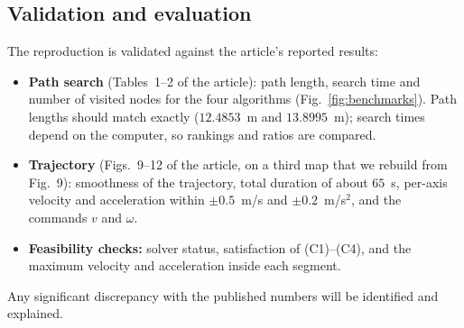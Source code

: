 \subsection{Validation and evaluation}
The reproduction is validated against the article's reported results:
\begin{itemize}
\item \textbf{Path search} (Tables~1--2 of the article): path length, search time and number of visited nodes for the four algorithms (Fig.~\ref{fig:benchmarks}). Path lengths should match exactly ($12.4853$~m and $13.8995$~m); search times depend on the computer, so rankings and ratios are compared.
\item \textbf{Trajectory} (Figs.~9--12 of the article, on a third map that we rebuild from Fig.~9): smoothness of the trajectory, total duration of about $65$~s, per-axis velocity and acceleration within $\pm0.5$~m/s and $\pm0.2$~m/s$^2$, and the commands $v$ and $\omega$.
\item \textbf{Feasibility checks:} solver status, satisfaction of (C1)--(C4), and the maximum velocity and acceleration inside each segment.
\end{itemize}
Any significant discrepancy with the published numbers will be identified and explained.

